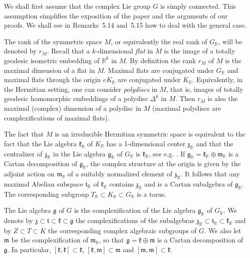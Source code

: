 \documentclass[10pt]{article}
\theoremstyle{definition}
\numberwithin{equation}{section}
\begin{document}
We shall first assume that the complex Lie group $G$ is simply connected. This assumption simplifies the exposition of the paper and the arguments of our proofs. We shall see in Remarks~5.14 and~5.15 how to deal with the general case.

The rank of the symmetric space $M$, or equivalently the real rank of $G_{\mathbb R}$, will be denoted by $r_M$. Recall that a $k$-dimensional \emph{flat} in $M$ is the image of a totally geodesic isometric embedding of $\mathbb R^k$ in $M$. By definition the rank $r_M$ of $M$ is the maximal dimension of a flat in $M$. Maximal flats are conjugated under $G_{\mathbb R}$ and maximal flats through the origin $eK_{\mathbb R}$ are conjugated under $K_{\mathbb R}$. Equivalently, in the Hermitian setting, one can consider \emph{polydiscs} in $M$, that is, images of totally geodesic homomorphic embeddings of a polydisc $\Delta^k$ in $M$. Then $r_M$ is also the maximal (complex) dimension of a polydisc in $M$ (maximal polydiscs are complexifications of maximal flats).

The fact that $M$ is an irreducible Hermitian symmetric space is equivalent to the fact that the Lie algebra $\mathfrak k_{\mathbb R}$ of $K_{\mathbb R}$ has a 1-dimensional center $\mathfrak z_{\mathbb R}$ and that the centralizer of $\mathfrak z_{\mathbb R}$ in the Lie algebra $\mathfrak g_{\mathbb R}$ of $G_{\mathbb R}$ is $\mathfrak k_{\mathbb R}$, see e.g. \cite{jep93Kna02}. If $\mathfrak g_{\mathbb R}=\mathfrak k_{\mathbb R}\oplus\mathfrak m_{\mathbb R}$ is a Cartan decomposition of $\mathfrak g_{\mathbb R}$, the complex structure at the origin is given by the adjoint action on $\mathfrak m_{\mathbb R}$ of a suitably normalized element of $\mathfrak z_{\mathbb R}$. It follows that any maximal Abelian subspace $\mathfrak t_{\mathbb R}$ of $\mathfrak k_{\mathbb R}$ contains $\mathfrak z_{\mathbb R}$ and is a Cartan subalgebra of $\mathfrak g_{\mathbb R}$. The corresponding subgroup $T_{\mathbb R}\subset K_{\mathbb R}\subset G_{\mathbb R}$ is a torus.

The Lie algebra $\mathfrak g$ of $G$ is the complexification of the Lie algebra $\mathfrak g_{\mathbb R}$ of $G_{\mathbb R}$. We denote by $\mathfrak z\subset\mathfrak t\subset\mathfrak k\subset\mathfrak g$ the complexifications of the subalgebras $\mathfrak z_{\mathbb R}\subset\mathfrak t_{\mathbb R}\subset\mathfrak k_{\mathbb R}$ and by $Z\subset T\subset K$ the corresponding complex algebraic subgroups of $G$. We also let $\mathfrak m$ be the complexification of $\mathfrak m_{\mathbb R}$, so that $\mathfrak g=\mathfrak k\oplus\mathfrak m$ is a Cartan decomposition of $\mathfrak g$. In particular, $[\mathfrak k,\mathfrak k]\subset\mathfrak k$, $[\mathfrak k,\mathfrak m]\subset\mathfrak m$ and $[\mathfrak m,\mathfrak m]\subset\mathfrak k$.
\end{document}
